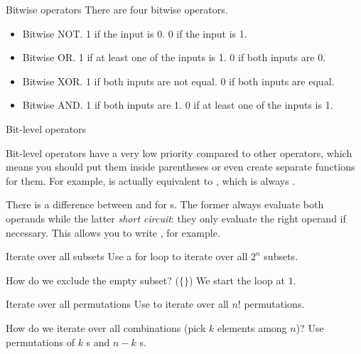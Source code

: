 \documentclass[handout,code=programming-tricks,title={Efficient
  implementation and debugging}]{../share/cpslide}
\begin{document}
\begin{frame}{Bitwise operators}
  There are four bitwise operators.
  \begin{itemize}
  \item {} Bitwise NOT. 1 if the input is 0. 0 if the input is 1.
  \item {} Bitwise OR. 1 if at least one of the inputs is 1. 0 if both
    inputs are 0.
  \item {} Bitwise XOR. 1 if both inputs are not equal. 0 if both
    inputs are equal.
  \item {} Bitwise AND. 1 if both inputs are 1. 0 if at least one of the
    inputs is 1.
  \end{itemize}
\end{frame}

\begin{frame}{Bit-level operators}
  \begin{warning}
   Bit-level operators have a very low priority compared to other operators, which means you
   should put them inside parentheses or even create separate functions for
   them. For example,  is actually equivalent to ,
   which is always .

   There is a difference between \ci{\&|} and \ci{\&\&||} for s. The
   former always evaluate both operands while the latter \textit{short circuit}:
   they only evaluate the right operand if necessary. This allows you to write
   , for example.
  \end{warning}
\end{frame}

\begin{frame}{Iterate over all subsets}
  Use a for loop to iterate over all $2^n$ subsets.

  \pause
  \begin{question}{How do we exclude the empty subset? ($\{\}$)}
    We start the loop at $1$.
  \end{question}
\end{frame}

\begin{frame}{Iterate over all permutations}
  Use  to iterate over all $n!$ permutations.

  \begin{question}{How do we iterate over all combinations (pick $k$ elements among $n$)?}
    Use permutations of $k$ s and $n-k$ s.
  \end{question}
\end{frame}
\end{document}
